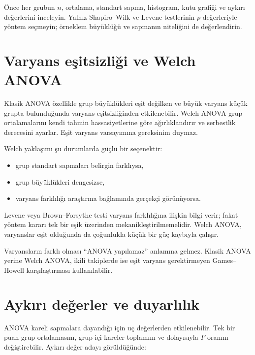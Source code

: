 \begin{assumptionbox}
Önce her grubun $n$, ortalama, standart sapma, histogram, kutu grafiği ve
aykırı değerlerini inceleyin. Yalnız Shapiro--Wilk ve Levene testlerinin
$p$-değerleriyle yöntem seçmeyin; örneklem büyüklüğü ve sapmanın niteliğini de
değerlendirin.
\end{assumptionbox}

\section{Varyans eşitsizliği ve Welch ANOVA}

Klasik ANOVA özellikle grup büyüklükleri eşit değilken ve büyük varyans küçük
grupta bulunduğunda varyans eşitsizliğinden etkilenebilir. Welch ANOVA grup
ortalamalarını kendi tahmin hassasiyetlerine göre ağırlıklandırır ve
serbestlik derecesini ayarlar. Eşit varyans varsayımına gereksinim duymaz.

Welch yaklaşımı şu durumlarda güçlü bir seçenektir:

\begin{itemize}
  \item grup standart sapmaları belirgin farklıysa,
  \item grup büyüklükleri dengesizse,
  \item varyans farklılığı araştırma bağlamında gerçekçi görünüyorsa.
\end{itemize}

Levene veya Brown--Forsythe testi varyans farklılığına ilişkin bilgi verir;
fakat yöntem kararı tek bir eşik üzerinden mekanikleştirilmemelidir. Welch
ANOVA, varyanslar eşit olduğunda da çoğunlukla küçük bir güç kaybıyla çalışır.

\begin{mistakebox}
Varyansların farklı olması ``ANOVA yapılamaz'' anlamına gelmez. Klasik ANOVA
yerine Welch ANOVA, ikili takiplerde ise eşit varyans gerektirmeyen
Games--Howell karşılaştırması kullanılabilir.
\end{mistakebox}

\section{Aykırı değerler ve duyarlılık}

ANOVA kareli sapmalara dayandığı için uç değerlerden etkilenebilir. Tek bir
puan grup ortalamasını, grup içi kareler toplamını ve dolayısıyla $F$ oranını
değiştirebilir. Aykırı değer adayı görüldüğünde:

